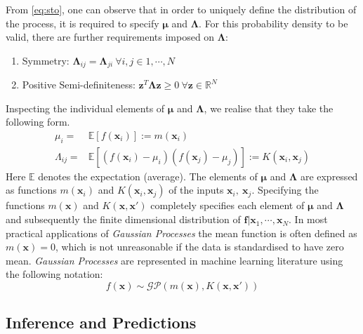 From \cref{eq:sto}, one can observe that in order to uniquely define the distribution of the 
process, it is required to specify $\mathbf{\mu}$ and $\mathbf{\Lambda}$. For this probability 
density to be valid, there are further requirements imposed on $\mathbf{\Lambda}$: 


\begin{enumerate}
      \item Symmetry: 
            $\mathbf{\Lambda}_{ij} = \mathbf{\Lambda}_{ji} \ \forall i,j \in {1, \cdots, N} $ 
      \item Positive Semi-definiteness: 
            $\mathbf{z}^T \mathbf{\Lambda} \mathbf{z} \geq 0 \ \forall \mathbf{z} \in \mathbb{R}^N$  
\end{enumerate}

Inspecting the individual elements of $\mathbf{\mu}$ and $\mathbf{\Lambda}$, we realise that they 
take the following form.
%
\begin{align}
      \mu_i = & \mathbb{E}[f(\mathbf{x}_i)] := m(\mathbf{x}_i) \\
      \Lambda_{ij} = & \mathbb{E}[(f(\mathbf{x}_i) - \mu_i)(f(\mathbf{x}_j) - \mu_j)] := K(\mathbf{x}_i, \mathbf{x}_j)
\end{align}
%
Here $\mathbb{E}$ denotes the expectation (average). The elements of $\mathbf{\mu}$ and 
$\mathbf{\Lambda}$ are expressed as functions $m(\mathbf{x}_i)$ and $K(\mathbf{x}_i, \mathbf{x}_j)$ 
of the inputs $\mathbf{x}_i,\ \mathbf{x}_j$. Specifying the functions $m(\mathbf{x})$ and 
$K(\mathbf{x}, \mathbf{x}')$ completely specifies each element of 
$\mathbf{\mu}$ and $\mathbf{\Lambda}$ and subsequently the finite dimensional distribution of 
$\mathbf{f} | \mathbf{x}_1, \cdots, \mathbf{x}_N $. In most practical applications of 
\emph{Gaussian Processes} the mean function is often defined as $m(\mathbf{x}) = 0$, which is not 
unreasonable if the data is standardised to have zero mean. \emph{Gaussian Processes} are 
represented in machine learning literature using the following notation:
%
\begin{equation}\label{eq:gpformulation}
    f(\mathbf{x}) \sim \mathcal{GP}(m(\mathbf{x}), K(\mathbf{x}, \mathbf{x}'))
\end{equation}

\subsection{Inference and Predictions} \label{sec:inference}

